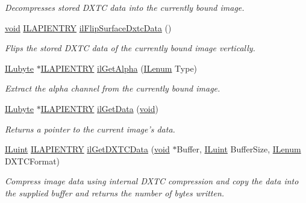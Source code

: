 \begin{DoxyCompactItemize}
\begin{DoxyCompactList}\small\item\em Decompresses stored D\+X\+T\+C data into the currently bound image. \end{DoxyCompactList}\item 
\hyperlink{_i_l_8h_a5530e04d947bcddd83639ea7940faf10}{void} \hyperlink{_i_l_8h_a69c08a8d06df986f7e46f209d131ef2f}{I\+L\+A\+P\+I\+E\+N\+T\+R\+Y} \hyperlink{group__data_ga275bf97933de4ca996bcceeee3a58621}{il\+Flip\+Surface\+Dxtc\+Data} ()
\begin{DoxyCompactList}\small\item\em Flips the stored D\+X\+T\+C data of the currently bound image vertically. \end{DoxyCompactList}\item 
\hyperlink{group__il__types_ga057357939bc5a12e8061715453568519}{I\+Lubyte} $\ast$\hyperlink{_i_l_8h_a69c08a8d06df986f7e46f209d131ef2f}{I\+L\+A\+P\+I\+E\+N\+T\+R\+Y} \hyperlink{group__data_gaaf70fd0dbf35dd1e31700543c6e763d4}{il\+Get\+Alpha} (\hyperlink{group__il__types_ga62ca73445716183ef42b1f3906a45ed0}{I\+Lenum} Type)
\begin{DoxyCompactList}\small\item\em Extract the alpha channel from the currently bound image. \end{DoxyCompactList}\item 
\hyperlink{group__il__types_ga057357939bc5a12e8061715453568519}{I\+Lubyte} $\ast$\hyperlink{_i_l_8h_a69c08a8d06df986f7e46f209d131ef2f}{I\+L\+A\+P\+I\+E\+N\+T\+R\+Y} \hyperlink{group__data_ga7935a3b79dcdc71ee0f682854939dcc9}{il\+Get\+Data} (\hyperlink{_i_l_8h_a5530e04d947bcddd83639ea7940faf10}{void})
\begin{DoxyCompactList}\small\item\em Returns a pointer to the current image's data. \end{DoxyCompactList}\item 
\hyperlink{group__il__types_gaff8e86a1072c8d7cfe387fb87c6ed8e1}{I\+Luint} \hyperlink{_i_l_8h_a69c08a8d06df986f7e46f209d131ef2f}{I\+L\+A\+P\+I\+E\+N\+T\+R\+Y} \hyperlink{group__data_ga4ae3b92dd5e43a62dd44b3ee9d85087f}{il\+Get\+D\+X\+T\+C\+Data} (\hyperlink{_i_l_8h_a5530e04d947bcddd83639ea7940faf10}{void} $\ast$Buffer, \hyperlink{group__il__types_gaff8e86a1072c8d7cfe387fb87c6ed8e1}{I\+Luint} Buffer\+Size, \hyperlink{group__il__types_ga62ca73445716183ef42b1f3906a45ed0}{I\+Lenum} D\+X\+T\+C\+Format)
\begin{DoxyCompactList}\small\item\em Compress image data using internal D\+X\+T\+C compression and copy the data into the supplied buffer and returns the number of bytes written. \end{DoxyCompactList}\item 

\end{DoxyCompactItemize}
